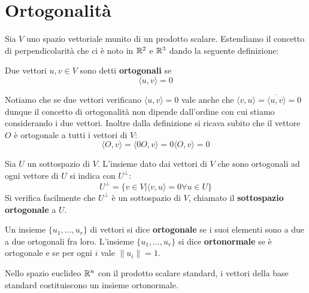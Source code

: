 \section{Ortogonalità}
Sia $V$ uno spazio vettoriale munito di un prodotto scalare. Estendiamo il
concetto di perpendicolarità che ci è noto in $\mathbb{R}^2$ e
$\mathbb{R}^3$ dando la seguente definizione:

\begin{definition}
	Due vettori $u, v \in V$ sono detti \textbf{ortogonali} se
	\[
		\langle u, v \rangle = 0
	\]
\end{definition}

Notiamo che se due vettori verificano $\langle u, v \rangle = 0$ vale anche che
$\langle v, u \rangle = \overline{\langle u, v \rangle} = 0$ dunque il concetto
di ortogonalità non dipende dall'ordine con cui stiamo considerando i due
vettori. Inoltre dalla definizione si ricava subito che il vettore $O$ è
ortogonale a tutti i vettori di $V$:
\[
	\langle O, v \rangle = \langle 0O, v \rangle = 0\langle O, v \rangle = 0
\]

\begin{definition}
	Sia $U$ un sottospazio di $V$. L'insieme dato dai vettori di $V$ che sono
	ortogonali ad ogni vettore di $U$ si indica con $U^{\perp}$:
	\[
		U^{\perp} = \{v \in V | \langle v, u \rangle = 0 \forall u \in U\}
	\]
	Si verifica facilmente che $U^{\perp}$ è un sottospazio di $V$, chiamato
	il \textbf{sottospazio ortogonale} a $U$.
\end{definition}

\begin{definition}
	Un insieme $\{u_1, \dots, u_r\}$ di vettori si dice \textbf{ortogonale} se
	i suoi elementi sono a due a due ortogonali fra loro. L'insieme
	$\{u_1, \dots, u_r\}$ si dice \textbf{ortonormale} se è ortogonale e se
	per ogni $i$ vale $\| u_i \| = 1$.
\end{definition}

\begin{example}
	Nello spazio euclideo $\mathbb{R}^n$ con il prodotto scalare standard,
	i vettori della base standard costituiscono un insieme ortonormale.
\end{example}

